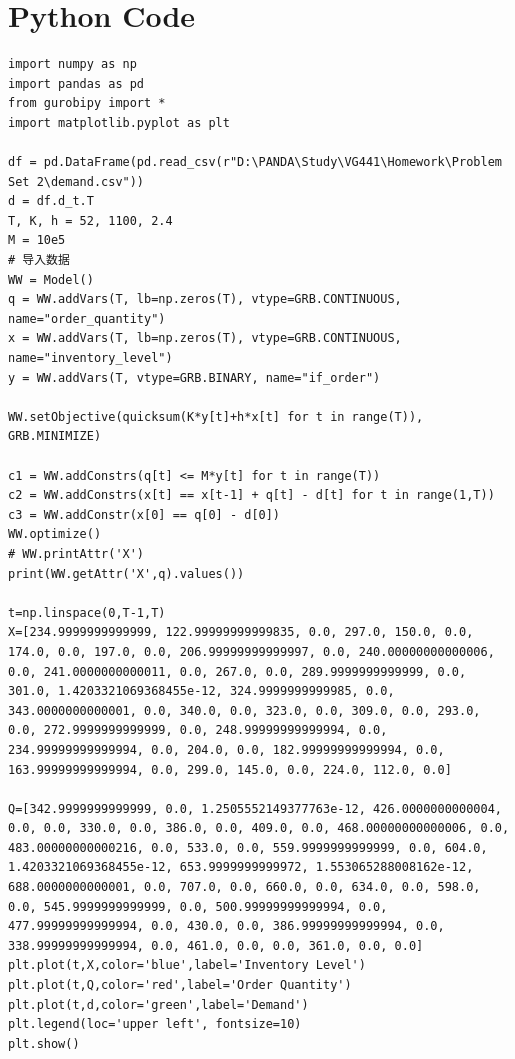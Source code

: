 \documentclass[a4paper]{article}
\begin{document}
\section*{Python Code}
\begin{verbatim}
import numpy as np
import pandas as pd
from gurobipy import *
import matplotlib.pyplot as plt

df = pd.DataFrame(pd.read_csv(r"D:\PANDA\Study\VG441\Homework\Problem Set 2\demand.csv"))
d = df.d_t.T
T, K, h = 52, 1100, 2.4
M = 10e5
# 导入数据
WW = Model()
q = WW.addVars(T, lb=np.zeros(T), vtype=GRB.CONTINUOUS, name="order_quantity")
x = WW.addVars(T, lb=np.zeros(T), vtype=GRB.CONTINUOUS, name="inventory_level")
y = WW.addVars(T, vtype=GRB.BINARY, name="if_order")

WW.setObjective(quicksum(K*y[t]+h*x[t] for t in range(T)), GRB.MINIMIZE)

c1 = WW.addConstrs(q[t] <= M*y[t] for t in range(T))
c2 = WW.addConstrs(x[t] == x[t-1] + q[t] - d[t] for t in range(1,T))
c3 = WW.addConstr(x[0] == q[0] - d[0])
WW.optimize()
# WW.printAttr('X')
print(WW.getAttr('X',q).values())

t=np.linspace(0,T-1,T)
X=[234.9999999999999, 122.99999999999835, 0.0, 297.0, 150.0, 0.0, 174.0, 0.0, 197.0, 0.0, 206.99999999999997, 0.0, 240.00000000000006, 0.0, 241.0000000000011, 0.0, 267.0, 0.0, 289.9999999999999, 0.0, 301.0, 1.4203321069368455e-12, 324.9999999999985, 0.0, 343.0000000000001, 0.0, 340.0, 0.0, 323.0, 0.0, 309.0, 0.0, 293.0, 0.0, 272.9999999999999, 0.0, 248.99999999999994, 0.0, 234.99999999999994, 0.0, 204.0, 0.0, 182.99999999999994, 0.0, 163.99999999999994, 0.0, 299.0, 145.0, 0.0, 224.0, 112.0, 0.0]

Q=[342.9999999999999, 0.0, 1.2505552149377763e-12, 426.0000000000004, 0.0, 0.0, 330.0, 0.0, 386.0, 0.0, 409.0, 0.0, 468.00000000000006, 0.0, 483.00000000000216, 0.0, 533.0, 0.0, 559.9999999999999, 0.0, 604.0, 1.4203321069368455e-12, 653.9999999999972, 1.553065288008162e-12, 688.0000000000001, 0.0, 707.0, 0.0, 660.0, 0.0, 634.0, 0.0, 598.0, 0.0, 545.9999999999999, 0.0, 500.99999999999994, 0.0, 477.99999999999994, 0.0, 430.0, 0.0, 386.99999999999994, 0.0, 338.99999999999994, 0.0, 461.0, 0.0, 0.0, 361.0, 0.0, 0.0]
plt.plot(t,X,color='blue',label='Inventory Level')
plt.plot(t,Q,color='red',label='Order Quantity')
plt.plot(t,d,color='green',label='Demand')
plt.legend(loc='upper left', fontsize=10)
plt.show()
\end{verbatim}
\end{document}
